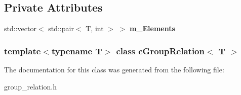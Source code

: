 \subsection*{\-Private \-Attributes}
\begin{DoxyCompactItemize}
\item 
\hypertarget{classcGroupRelation_a71fe79690808fb895d27eee80edc99d4}{std\-::vector$<$ std\-::pair$<$ \-T, int $>$ $>$ {\bfseries m\-\_\-\-Elements}}\label{classcGroupRelation_a71fe79690808fb895d27eee80edc99d4}

\end{DoxyCompactItemize}
\subsubsection*{template$<$typename \-T$>$ class c\-Group\-Relation$<$ T $>$}



\-The documentation for this class was generated from the following file\-:\begin{DoxyCompactItemize}
\item 
group\-\_\-relation.\-h\end{DoxyCompactItemize}
